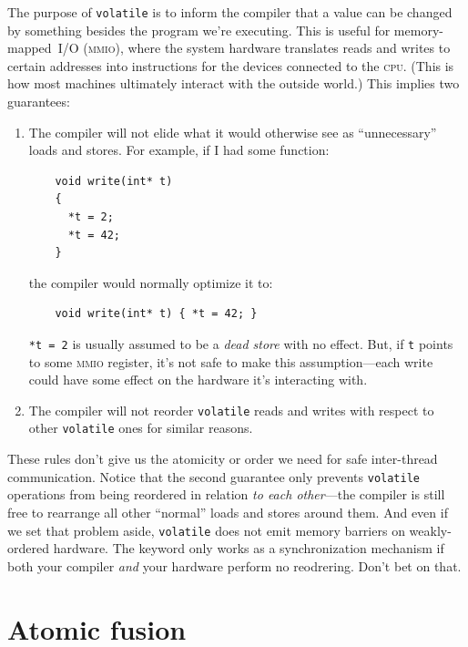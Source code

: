\documentclass[fontsize=10pt, numbers=endperiod]{scrartcl}
\newcommand{\codesize}{\fontsize{10pt}{12pt}}
\newcommand{\monobox}[1]{\mbox{\texttt{#1}}}
\newcommand{\keyword}[1]{\monobox{\color{darkGreen}#1}}
\newcommand{\introduce}[1]{\textit{#1}}
\newenvironment{colfigure}
  {\par\vspace{1\baselineskip minus 0.5\baselineskip}\noindent\minipage{\linewidth}}
  {\endminipage\vspace*{1\baselineskip minus 0.7\baselineskip}}
\begin{document}
\begin{multicols}{2}
The purpose of \keyword{volatile} is to inform the compiler that a value can
be changed by something besides the program we're executing.
This is useful for memory-mapped~\textsc{I/O} \textsc{(mmio)},
where the system hardware translates reads and writes to certain addresses
into instructions for the devices connected to the \textsc{cpu}.
(This is how most machines ultimately interact with the outside world.)
This implies two guarantees:
\begin{enumerate}
\item The compiler will not elide what it would otherwise see as ``unnecessary''
    loads and stores. For example, if I had some function:
    \begin{colfigure}
    \begin{verbatim}
    void write(int* t)
    {
      *t = 2;
      *t = 42;
    }
    \end{verbatim}
    \end{colfigure}
    the compiler would normally optimize it to:
    \begin{verbatim}
    void write(int* t) { *t = 42; }
    \end{verbatim}
    \texttt{*t = 2} is usually assumed to be a
    \introduce{dead store} with no effect.
    But, if \texttt{t} points to some \textsc{mmio} register, it's not
    safe to make this assumption---each write could have some effect
    on the hardware it's interacting with.

\item The compiler will not reorder \keyword{volatile}
    reads and writes with respect to other \keyword{volatile} ones
    for similar reasons.
\end{enumerate}

These rules don't give us the atomicity or order we need for safe
inter-thread communication.
Notice that the second guarantee only prevents \keyword{volatile} operations
from being reordered in relation \emph{to each other}---the compiler is still
free to rearrange all other ``normal'' loads and stores around them.
And even if we set that problem aside,
\keyword{volatile} does not emit memory barriers on weakly-ordered hardware.
The keyword only works as a synchronization mechanism if both your compiler
\emph{and} your hardware perform no reodrering.
Don't bet on that.

\section{Atomic fusion}
\label{fusing}


\end{multicols}
\end{document}
